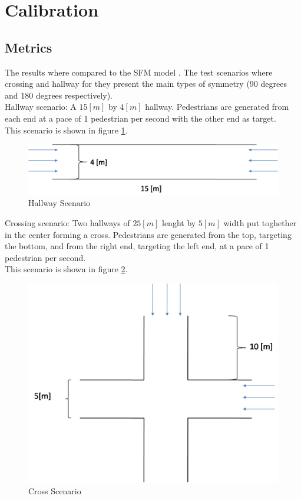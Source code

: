 \documentclass[english]{article}
\begin{document}
\section{Calibration}

\subsection{Metrics}

The results where compared to the SFM model \cite{key-helb2000}.
The test scenarios where crossing and hallway for they present the
main types of symmetry (90 degrees and 180 degrees respectively). \\


Hallway scenario: A $15[m]$ by $4[m]$ hallway. Pedestrians are generated
from each end at a pace of 1 pedestrian per second with the other
end as target. \\
 This scenario is shown in figure \ref{fig:hallway-scenario}.

\begin{figure}[h]
    \centering{}
    \includegraphics[scale=0.35]{pics/scenarios/hallway}
    \caption{\label{fig:hallway-scenario}Hallway Scenario}
\end{figure}

Crossing scenario: Two hallways of $25[m]$ lenght by $5[m]$ width
put toghether in the center forming a cross. Pedestrians are generated
from the top, targeting the bottom, and from the right end, targeting
the left end, at a pace of 1 pedestrian per second. \\
 This scenario is shown in figure \ref{fig:cross-scenario}.

\begin{figure}[h]
    \centering{}
    \includegraphics[scale=0.3]{pics/scenarios/cross}
    \caption{\label{fig:cross-scenario}Cross Scenario}
\end{figure}
\end{document}
